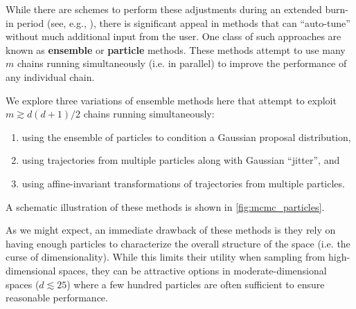 \documentclass[12pt, titlepage]{article}
\begin{document}
While there are schemes to perform these adjustments during
an extended burn-in period (see, e.g., \citealt{brooks+11}), there
is significant appeal in methods that can ``auto-tune'' without
much additional input from the user. One class of such approaches
are known as \textbf{ensemble} or \textbf{particle} methods.
These methods attempt to use many $m$ chains running
simultaneously (i.e. in parallel) to improve the performance 
of any individual chain.

We explore three variations of ensemble methods here
that attempt to exploit $m \gtrsim d(d+1)/2$ chains running
simultaneously:
\begin{enumerate}
    \item using the ensemble of particles to condition
    a Gaussian proposal distribution,
    \item using trajectories from multiple particles along with
    Gaussian ``jitter'', and
    \item using affine-invariant transformations of
    trajectories from multiple particles.
\end{enumerate}
A schematic illustration of these 
methods is shown in {\color{red} \autoref{fig:mcmc_particles}}.

As we might expect, an immediate drawback of these methods is
they rely on having enough particles to characterize
the overall structure of the space (i.e. the curse of dimensionality).
While this limits their utility when sampling from high-dimensional spaces, 
they can be attractive options in moderate-dimensional spaces 
($d \lesssim 25$) where a few hundred particles
are often sufficient to ensure reasonable performance.
\end{document}
